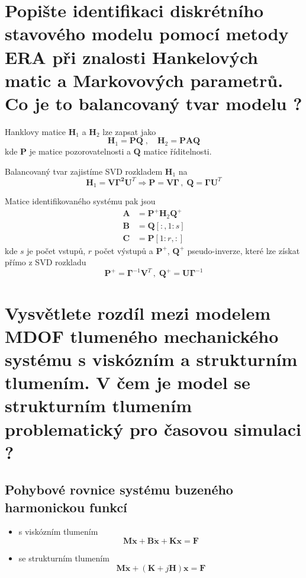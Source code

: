 \documentclass{article}
\begin{document}
	\section{Popište identifikaci diskrétního stavového modelu pomocí metody ERA při znalosti Hankelových matic a Markovových parametrů. Co je to balancovaný tvar modelu ? }

	Hanklovy matice $\bm{H}_1$ a $\bm{H}_2$ lze zapsat jako
	\begin{equation}
		\bm{H}_1 = \bm{P}\bm{Q}
		\;,\quad 
		\bm{H}_2 = \bm{P}\bm{A}\bm{Q}
	\end{equation}
	kde $\bm{P}$ je matice pozorovatelnosti a $\bm{Q}$ matice říditelnosti.

	Balancovaný tvar zajistíme SVD rozkladem $\bm{H}_1$ na
	\begin{equation}
		\bm{H}_1 = \bm{V}\bm{\Gamma^2}\bm{U}^T
		\Rightarrow
		\bm{P} = \bm{V}\bm{\Gamma} \,,\; \bm{Q} = \bm{\Gamma}\bm{U}^T
	\end{equation}

	Matice identifikovaného systému pak jsou
	\begin{align}
		\bm{A} &= \bm{P}^+ \bm{H}_2 \bm{Q}^+ \\
		\bm{B} &= \bm{Q}[:,1:s] \\
		\bm{C} &= \bm{P}[1:r,:]
	\end{align}
	kde $s$ je počet vstupů, $r$ počet výstupů a $\bm{P}^+$, $\bm{Q}^+$ pseudo-inverze, které lze získat přímo z SVD rozkladu
	\begin{equation}
		\bm{P}^+ = \bm{\Gamma}^{-1}\bm{V}^T
		\,,\;
		\bm{Q}^+ = \bm{U}\bm{\Gamma}^{-1}
	\end{equation}

	\section{Vysvětlete rozdíl mezi modelem MDOF tlumeného mechanického systému s viskózním a strukturním tlumením. V čem je model se strukturním tlumením problematický pro časovou simulaci ? }

	\subsection*{Pohybové rovnice systému buzeného harmonickou funkcí}
	\begin{itemize}
		\item s viskózním tlumením
		\begin{equation}
			\bm{M}\bm{\ddot{x}} + \bm{B}\bm{\dot{x}} + \bm{K}\bm{x} = \bm{F}
		\end{equation}
		\item se strukturním tlumením
		\begin{equation}
			\bm{M}\bm{\ddot{x}} + (\bm{K} + j\bm{H}) \bm{x} = \bm{F}
		\end{equation}
	\end{itemize}
\end{document}
